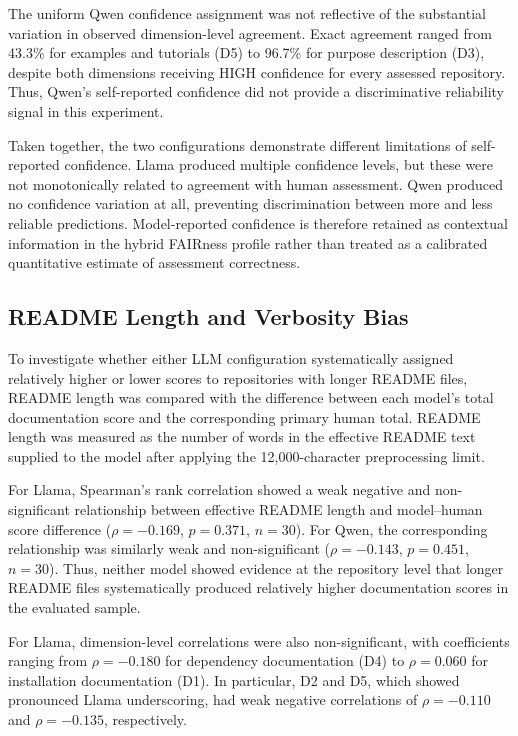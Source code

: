 The uniform Qwen confidence assignment was not reflective of the
substantial variation in observed dimension-level agreement. Exact
agreement ranged from 43.3\% for examples and tutorials (D5) to
96.7\% for purpose description (D3), despite both dimensions
receiving HIGH confidence for every assessed repository. Thus,
Qwen's self-reported confidence did not provide a discriminative
reliability signal in this experiment.

Taken together, the two configurations demonstrate different
limitations of self-reported confidence. Llama produced multiple
confidence levels, but these were not monotonically related to
agreement with human assessment. Qwen produced no confidence
variation at all, preventing discrimination between more and less
reliable predictions. Model-reported confidence is therefore retained
as contextual information in the hybrid FAIRness profile rather than
treated as a calibrated quantitative estimate of assessment
correctness.


\subsection{README Length and Verbosity Bias}

To investigate whether either LLM configuration systematically
assigned relatively higher or lower scores to repositories with
longer README files, README length was compared with the difference
between each model's total documentation score and the corresponding
primary human total. README length was measured as the number of words
in the effective README text supplied to the model after applying the
12,000-character preprocessing limit.

For Llama, Spearman's rank correlation showed a weak negative and
non-significant relationship between effective README length and
model--human score difference ($\rho=-0.169$, $p=0.371$, $n=30$).
For Qwen, the corresponding relationship was similarly weak and
non-significant ($\rho=-0.143$, $p=0.451$, $n=30$). Thus, neither
model showed evidence at the repository level that longer README
files systematically produced relatively higher documentation scores
in the evaluated sample.

For Llama, dimension-level correlations were also non-significant,
with coefficients ranging from $\rho=-0.180$ for dependency
documentation (D4) to $\rho=0.060$ for installation documentation
(D1). In particular, D2 and D5, which showed pronounced Llama
underscoring, had weak negative correlations of $\rho=-0.110$ and
$\rho=-0.135$, respectively.


